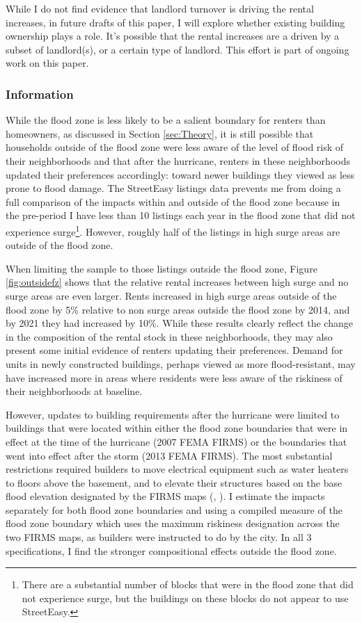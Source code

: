 \documentclass[12pt]{article}
\begin{document}
{{{{{{{{While I do not find evidence that landlord turnover is driving the rental increases, in future drafts of this paper, I will explore whether existing building ownership plays a role.  It's possible that the rental increases are a driven by a subset of landlord(s), or a certain type of landlord.  This effort is part of ongoing work on this paper.  

\subsubsection{Information}
While the flood zone is less likely to be a salient boundary for renters than homeowners, as discussed in Section \ref{sec:Theory}, it is still possible that households outside of the flood zone were less aware of the level of flood risk of their neighborhoods and that after the hurricane, renters in these neighborhoods updated their preferences accordingly: toward newer buildings they viewed as less prone to flood damage. The StreetEasy listings data prevents me from doing a full comparison of the impacts within and outside of the flood zone because in the pre-period I have less than 10 listings each year in the flood zone that did not experience surge\footnote{There are a substantial number of blocks that were in the flood zone that did not experience surge, but the buildings on these blocks do not appear to use StreetEasy.}.  However, roughly half of the listings in high surge areas are outside of the flood zone.  

When limiting the sample to those listings outside the flood zone, Figure \ref{fig:outsidefz} shows that the relative rental increases between high surge and no surge areas are even larger. Rents increased in high surge areas outside of the flood zone by 5\% relative to non surge areas outside the flood zone by 2014, and by 2021 they had increased by 10\%.  While these results clearly reflect the change in the composition of the rental stock in these neighborhoods, they may also present some initial evidence of renters updating their preferences.  Demand for units in newly constructed buildings, perhaps viewed as more flood-resistant, may have increased more in areas where residents were less aware of the riskiness of their neighborhoods at baseline.

However, updates to building requirements after the hurricane were limited to buildings that were located within either the flood zone boundaries that were in effect at the time of the hurricane (2007 FEMA FIRMS) or the boundaries that went into effect after the storm (2013 FEMA FIRMS). The most substantial restrictions required builders to move electrical equipment such as water heaters to floors above the basement, and to elevate their structures based on the base flood elevation designated by the FIRMS maps (\cite{nyc_building_code_new_2008}, \cite{nyc_department_of_buildings_rebuilding_2015}). I estimate the impacts separately for both flood zone boundaries and using a compiled measure of the flood zone boundary which uses the maximum riskiness designation across the two FIRMS maps, as builders were instructed to do by the city. In all 3 specifications, I find the stronger compositional effects outside the flood zone. 

}}}}}}}}
\end{document}
